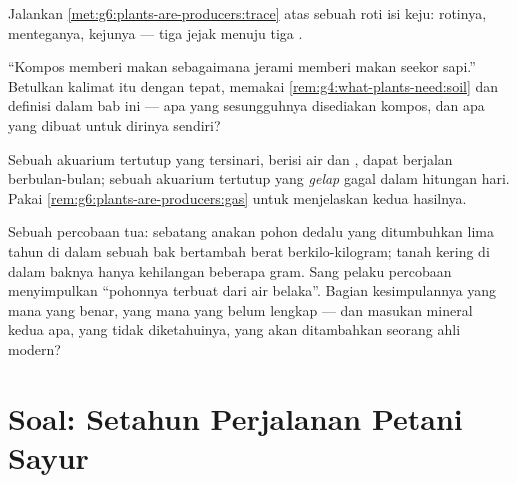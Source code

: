 \begin{exercise}[$\star\star$]\label{exo:g6:plants-are-producers:9}
Jalankan \cref{met:g6:plants-are-producers:trace} atas sebuah roti isi
keju: rotinya, menteganya, kejunya --- tiga jejak menuju tiga .
\end{exercise}

\begin{exercise}[$\star\star$]\label{exo:g6:plants-are-producers:10}
``Kompos memberi makan  sebagaimana jerami memberi makan
seekor sapi.'' Betulkan kalimat itu dengan tepat, memakai
\cref{rem:g4:what-plants-need:soil} dan definisi dalam bab ini --- apa
yang sesungguhnya disediakan kompos, dan apa yang dibuat 
untuk dirinya sendiri?
\end{exercise}

\begin{exercise}[$\star\star$]\label{exo:g6:plants-are-producers:11}
Sebuah akuarium tertutup yang tersinari, berisi  air dan ,
dapat berjalan berbulan-bulan; sebuah akuarium tertutup yang
\emph{gelap} gagal dalam hitungan hari. Pakai
\cref{rem:g6:plants-are-producers:gas} untuk menjelaskan kedua
hasilnya.
\end{exercise}

\begin{exercise}[$\star\star\star$]\label{exo:g6:plants-are-producers:12}
Sebuah percobaan tua: sebatang anakan pohon dedalu yang ditumbuhkan
lima tahun di dalam sebuah bak bertambah berat berkilo-kilogram; tanah
kering di dalam baknya hanya kehilangan beberapa gram. Sang pelaku
percobaan menyimpulkan ``pohonnya terbuat dari air belaka''. Bagian
kesimpulannya yang mana yang benar, yang mana yang belum lengkap ---
dan masukan mineral kedua apa, yang tidak diketahuinya, yang akan
ditambahkan seorang ahli  modern?
\end{exercise}

\section{Soal: Setahun Perjalanan Petani Sayur}

